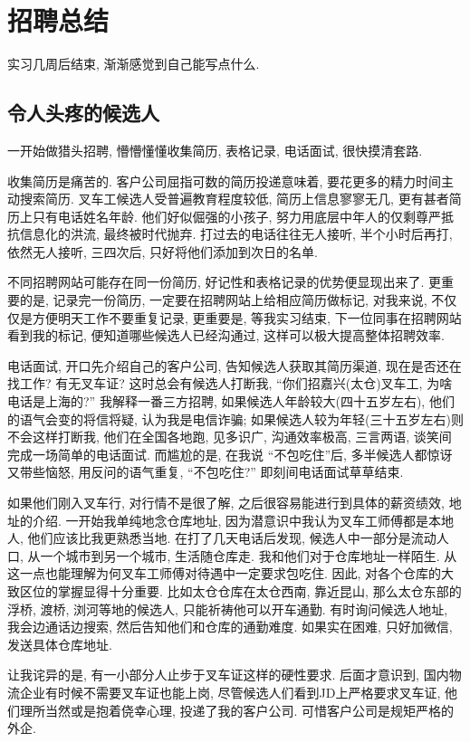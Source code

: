 \section{招聘总结}
实习几周后结束, 渐渐感觉到自己能写点什么. 

\subsection{令人头疼的候选人}
一开始做猎头招聘, 懵懵懂懂收集简历, 表格记录, 电话面试, 很快摸清套路. 

收集简历是痛苦的. 客户公司屈指可数的简历投递意味着, 要花更多的精力时间主动搜索简历. 叉车工候选人受普遍教育程度较低, 简历上信息寥寥无几, 更有甚者简历上只有电话姓名年龄. 他们好似倔强的小孩子, 努力用底层中年人的仅剩尊严抵抗信息化的洪流, 最终被时代抛弃. 打过去的电话往往无人接听, 半个小时后再打, 依然无人接听, 三四次后, 只好将他们添加到次日的名单. 

不同招聘网站可能存在同一份简历, 好记性和表格记录的优势便显现出来了. 更重要的是, 记录完一份简历, 一定要在招聘网站上给相应简历做标记, 对我来说, 不仅仅是方便明天工作不要重复记录, 更重要是, 等我实习结束, 下一位同事在招聘网站看到我的标记, 便知道哪些候选人已经沟通过, 这样可以极大提高整体招聘效率. 

电话面试, 开口先介绍自己的客户公司, 告知候选人获取其简历渠道, 现在是否还在找工作? 有无叉车证? 这时总会有候选人打断我, ``你们招嘉兴(太仓)叉车工, 为啥电话是上海的?'' 我解释一番三方招聘, 如果候选人年龄较大(四十五岁左右), 他们的语气会变的将信将疑, 认为我是电信诈骗; 如果候选人较为年轻(三十五岁左右)则不会这样打断我, 他们在全国各地跑, 见多识广, 沟通效率极高, 三言两语, 谈笑间完成一场简单的电话面试. 而尴尬的是, 在我说 ``不包吃住''后, 多半候选人都惊讶又带些恼怒, 用反问的语气重复, ``不包吃住?'' 即刻间电话面试草草结束.

如果他们刚入叉车行, 对行情不是很了解, 之后很容易能进行到具体的薪资绩效, 地址的介绍. 一开始我单纯地念仓库地址, 因为潜意识中我认为叉车工师傅都是本地人, 他们应该比我更熟悉当地. 在打了几天电话后发现, 候选人中一部分是流动人口, 从一个城市到另一个城市, 生活随仓库走. 我和他们对于仓库地址一样陌生. 从这一点也能理解为何叉车工师傅对待遇中一定要求包吃住. 因此, 对各个仓库的大致区位的掌握显得十分重要. 比如太仓仓库在太仓西南, 靠近昆山, 那么太仓东部的浮桥, 渡桥, 浏河等地的候选人, 只能祈祷他可以开车通勤. 有时询问候选人地址, 我会边通话边搜索, 然后告知他们和仓库的通勤难度. 如果实在困难, 只好加微信, 发送具体仓库地址. 

让我诧异的是, 有一小部分人止步于叉车证这样的硬性要求. 后面才意识到, 国内物流企业有时候不需要叉车证也能上岗, 尽管候选人们看到JD上严格要求叉车证, 他们理所当然或是抱着侥幸心理, 投递了我的客户公司. 可惜客户公司是规矩严格的外企. 

